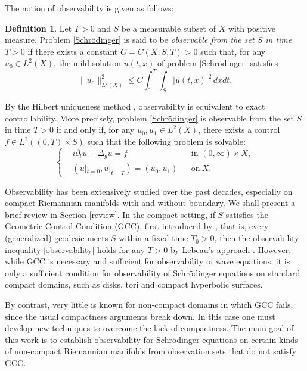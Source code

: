\documentclass[11pt,oneside,reqno]{amsart}
\theoremstyle{definition}
\newtheorem{definition}{Definition}[section]
\numberwithin{equation}{section}
\theoremstyle{plain}
\begin{document}
The notion of observability is given as follows:
\begin{definition}
    Let $T>0$ and $S$ be a measurable subset of $X$ with positive measure. Problem \eqref{Schrödinger} is said to be \emph{observable from the set $S$ in time $T>0$} if there exists a constant $C=C(X,S,T)>0$ such that, for any $u_0\in L^2(X)$, the mild solution $u(t,x)$ of problem \eqref{Schrödinger} satisfies
    \begin{equation}\label{observability}
        \| u_0\|^2_{L^2(X)}\le C \int_0^T \int_S| u(t,x) |^2 \,dxdt.
    \end{equation}
\end{definition}

By the Hilbert uniqueness method \cite{Lions88vol1, Lions88vol2}, observability is equivalent to exact controllability. More precisely, problem \eqref{Schrödinger} is observable from the set $S$ in time $T>0$ if and only if, for any $u_0 , u_1\in L^2(X)$, there exists a control $f \in L^2((0, T) \times S)$ such that the following problem is solvable:
\begin{equation*}
\left\{\begin{aligned}
    &i\partial_t u +\Delta_g  u =f && \text{in } (0,\infty)\times X,\\
    &(u|_{t=0},u|_{t=T}) =(u_0, u_1) && \mathrm{on}\  X.
\end{aligned}\right.
\end{equation*}

Observability has been extensively studied over the past decades, especially on compact Riemannian manifolds with and without boundary. We shall present a brief review in Section \ref{review}. In the compact setting, if $S$ satisfies the Geometric Control Condition (GCC), first introduced by \cite{bardo1992}, that is, every (generalized) geodesic meets $S$ within a fixed time $T_0>0$, then the observability inequality \eqref{observability} holds for any $T>0$ by Lebeau's approach \cite{lebeau1992controle}. However, while GCC is necessary and sufficient for observability of wave equations, it is only a sufficient condition for observability of Schrödinger equations on standard compact domains, such as disks, tori and compact hyperbolic surfaces. 

By contrast, very little is known for non-compact domains in which GCC fails, since the usual compactness arguments break down. In this case one must develop new techniques to overcome the lack of compactness. The main goal of this work is to establish observability for Schrödinger equations on certain kinds of non-compact Riemannian manifolds from observation sets that do not satisfy GCC.
\end{document}
